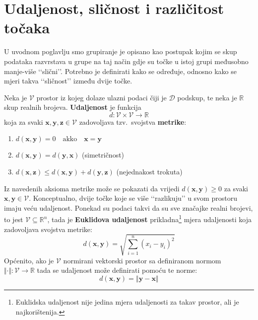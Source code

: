 \documentclass[times, utf8, zavrsni]{fer}
\begin{document}
\section{Udaljenost, sličnost i različitost točaka}
\label{pointsimilarity}
U uvodnom poglavlju smo grupiranje je opisano kao postupak kojim se skup podataka razvrstava u grupe na taj način gdje su točke u istoj grupi međusobno manje-više ‘‘slični’’. Potrebno je definirati kako se određuje, odnosno kako se mjeri takva ‘‘sličnost’’ između dvije točke.

Neka je $\mathcal{V}$ prostor iz kojeg dolaze ulazni podaci čiji je $\mathcal{D}$ podskup, te neka je $\mathbb{R}$ skup realnih brojeva. \textbf{Udaljenost}  je funkcija
\[d: \mathcal{V} \times \mathcal{V} \to \mathbb{R}\]
koja za svaki \(\mathbf{x}, \mathbf{y}, \mathbf{z} \in \mathcal{V}\) zadovoljava tzv.\ svojstva \textbf{metrike}:
\begin{enumerate}
    \item \(d \left(\mathbf{x}, \mathbf{y}\right) = 0 \quad
                \text{akko} \quad \mathbf{x} = \mathbf{y}\)
    \item \(d \left(\mathbf{x}, \mathbf{y}\right) = d \left(\mathbf{y}, \mathbf{x}\right)\) \qquad (simetričnost)
    \item \(d \left(\mathbf{x}, \mathbf{z}\right) \leq 
            d \left(\mathbf{x}, \mathbf{y}\right)
            + d \left(\mathbf{y}, \mathbf{z}\right)\) \qquad (nejednakost trokuta)
\end{enumerate}
Iz navedenih aksioma metrike može se pokazati da vrijedi \(d \left(\mathbf{x}, \mathbf{y}\right) \geq 0\)
za svaki \(\mathbf{x}, \mathbf{y} \in \mathcal{V}\).
Konceptualno, dvije točke koje se više ‘‘razlikuju’’ u svom prostoru imaju veću udaljenost.
Ponekad su podaci takvi da su sve značajke realni brojevi, to jest $\mathcal{V} \subseteq \mathbb{R}^{n}$, tada je \textbf{Euklidova udaljenost} prikladna\footnote{Euklidska udaljenost nije jedina mjera udaljenosti za takav prostor, ali je najkorištenija.} mjera udaljenosti koja zadovoljava svojstva metrike:
\begin{equation}
    d \left(\mathbf{x}, \mathbf{y}\right) = 
    \sqrt{\sum_{i=1}^{n} \left(x_i - y_i\right)^2}
    \label{euclidean_distance}
\end{equation}
Općenito, ako je \(\mathcal{V}\) normirani vektorski prostor sa definiranom normom \(\Vert \cdot \Vert : \mathcal{V} \to \mathbb{R}\) tada se udaljenost može definirati pomoću te norme:
\begin{equation}
    d \left(\mathbf{x}, \mathbf{y}\right) = \left\Vert \mathbf{y} - \mathbf{x} \right\Vert
    \label{norm_distance}
\end{equation}
\end{document}
